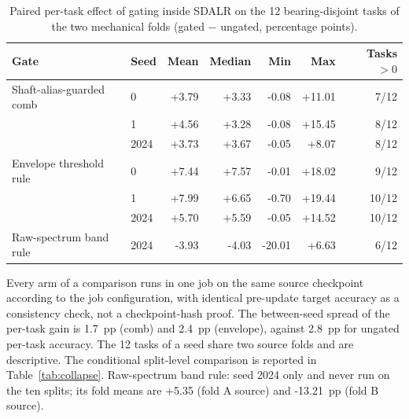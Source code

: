 \begin{table}[htbp]
\centering
\caption{Paired per-task effect of gating inside SDALR on the 12 bearing-disjoint tasks of the two mechanical folds (gated $-$ ungated, percentage points).}
\label{tab:gains}
\small
\setlength{\tabcolsep}{4pt}
\begin{tabular}{llrrrrr}
\toprule
Gate & Seed & Mean & Median & Min & Max & Tasks $>0$ \\
\midrule
Shaft-alias-guarded comb & 0 & +3.79 & +3.33 & -0.08 & +11.01 & 7/12 \\
 & 1 & +4.56 & +3.28 & -0.08 & +15.45 & 8/12 \\
 & 2024 & +3.73 & +3.67 & -0.05 & +8.07 & 8/12 \\
\midrule
Envelope threshold rule & 0 & +7.44 & +7.57 & -0.01 & +18.02 & 9/12 \\
 & 1 & +7.99 & +6.65 & -0.70 & +19.44 & 10/12 \\
 & 2024 & +5.70 & +5.59 & -0.05 & +14.52 & 10/12 \\
\midrule
Raw-spectrum band rule & 2024 & -3.93 & -4.03 & -20.01 & +6.63 & 6/12 \\
\bottomrule
\end{tabular}
\begin{minipage}{\linewidth}\vspace{2pt}\footnotesize Every arm of a comparison runs in one job on the same source checkpoint according to the job configuration, with identical pre-update target accuracy as a consistency check, not a checkpoint-hash proof. The between-seed spread of the per-task gain is 1.7~pp (comb) and 2.4~pp (envelope), against 2.8~pp for ungated per-task accuracy. The 12 tasks of a seed share two source folds and are descriptive. The conditional split-level comparison is reported in Table~\ref{tab:collapse}. Raw-spectrum band rule: seed 2024 only and never run on the ten splits; its fold means are +5.35 (fold A source) and -13.21~pp (fold B source).\end{minipage}
\end{table}
